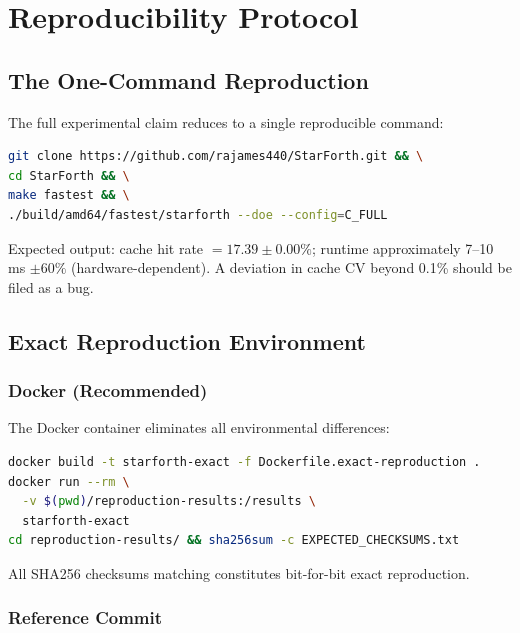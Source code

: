 
\section{Reproducibility Protocol}
\label{sec:reproducibility}

\subsection{The One-Command Reproduction}

The full experimental claim reduces to a single reproducible command:

\begin{lstlisting}[language=bash]
git clone https://github.com/rajames440/StarForth.git && \
cd StarForth && \
make fastest && \
./build/amd64/fastest/starforth --doe --config=C_FULL
\end{lstlisting}

Expected output: cache hit rate $= 17.39 \pm 0.00\%$; runtime approximately
7--10\,ms $\pm 60\%$ (hardware-dependent). A deviation in cache CV beyond
0.1\% should be filed as a bug.

\subsection{Exact Reproduction Environment}

\subsubsection{Docker (Recommended)}

The Docker container eliminates all environmental differences:

\begin{lstlisting}[language=bash]
docker build -t starforth-exact -f Dockerfile.exact-reproduction .
docker run --rm \
  -v $(pwd)/reproduction-results:/results \
  starforth-exact
cd reproduction-results/ && sha256sum -c EXPECTED_CHECKSUMS.txt
\end{lstlisting}

All SHA256 checksums matching constitutes bit-for-bit exact reproduction.

\subsubsection{Reference Commit}

